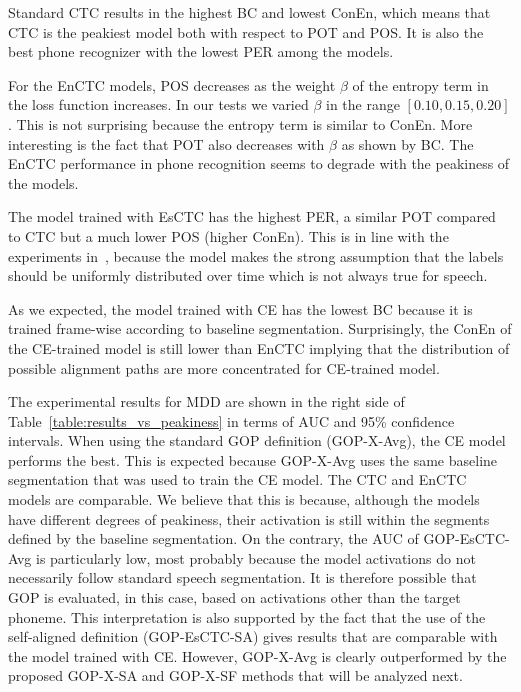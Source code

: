 Standard CTC results in the highest BC and lowest ConEn, which means that CTC is the peakiest model both with respect to POT and POS. 
It is also the best phone recognizer with the lowest PER among the models.

For the EnCTC models, POS decreases as the weight $\beta$ of the entropy term in the loss function increases.
In our tests we varied $\beta$ in the range $[0.10,0.15,0.20]$.
This is not surprising because the entropy term is similar to ConEn.
More interesting is the fact that POT also decreases with $\beta$ as shown by BC.
The EnCTC performance in phone recognition seems to degrade with the peakiness of the models.

The model trained with EsCTC has the highest PER, a similar POT compared to CTC but a much lower POS (higher ConEn).
This is in line with the experiments in~\cite{CTC-ME}, because the model makes the strong assumption that the labels should be uniformly distributed over time which is not always true for speech. 

As we expected, the model trained with CE has the lowest BC because it is trained frame-wise according to baseline segmentation.
Surprisingly, the ConEn of the CE-trained model is still lower than EnCTC implying that the distribution of possible alignment paths are more concentrated for CE-trained model. 


%

The experimental results for MDD are shown in the right side of Table~\ref{table:results_vs_peakiness} in terms of AUC and 95\% confidence intervals.
When using the standard GOP definition (GOP-X-Avg), the CE model performs the best.
This is expected because GOP-X-Avg uses the same baseline segmentation that was used to train the CE model.
The CTC and EnCTC models are comparable.
We believe that this is because, although the models have different degrees of peakiness, their activation is still within the segments defined by the baseline segmentation.
On the contrary, the AUC of GOP-EsCTC-Avg is particularly low, most probably because the model activations do not necessarily follow standard speech segmentation.
It is therefore possible that GOP is evaluated, in this case, based on activations other than the target phoneme.
This interpretation is also supported by the fact that the use of the self-aligned definition (GOP-EsCTC-SA) gives results that are comparable with the model trained with CE.
However, GOP-X-Avg is clearly outperformed by the proposed GOP-X-SA and GOP-X-SF methods that will be analyzed next.


